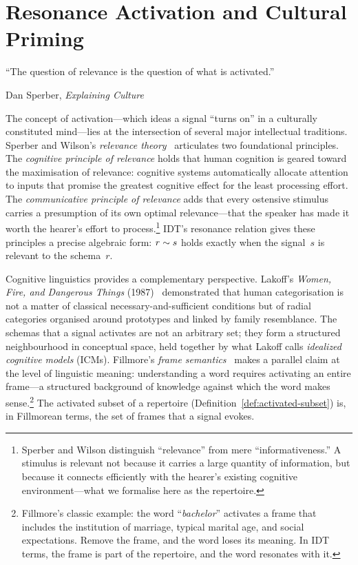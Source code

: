 
\chapter{Resonance Activation and Cultural Priming}
\label{ch:activation}

\epigraph{``The question of relevance is the question of what is
activated.''}{Dan Sperber, \textit{Explaining Culture}}


The concept of activation---which ideas a signal ``turns on'' in a
culturally constituted mind---lies at the intersection of several
major intellectual traditions.  Sperber and Wilson's \emph{relevance
theory}~\cite{sperber1995} articulates two foundational principles.
The \emph{cognitive principle of relevance} holds that human cognition
is geared toward the maximisation of relevance: cognitive systems
automatically allocate attention to inputs that promise the greatest
cognitive effect for the least processing effort.  The
\emph{communicative principle of relevance} adds that every ostensive
stimulus carries a presumption of its own optimal relevance---that the
speaker has made it worth the hearer's effort to
process.\footnote{Sperber and Wilson distinguish ``relevance'' from
mere ``informativeness.''  A stimulus is relevant not because it
carries a large quantity of information, but because it connects
efficiently with the hearer's existing cognitive environment---what we
formalise here as the repertoire.}  IDT's resonance relation gives
these principles a precise algebraic form: $r \sim s$ holds exactly
when the signal~$s$ is relevant to the schema~$r$.

Cognitive linguistics provides a complementary perspective.  Lakoff's
\emph{Women, Fire, and Dangerous Things} (1987)~\cite{lakoff1987}
demonstrated that human categorisation is not a matter of classical
necessary-and-sufficient conditions but of radial categories organised
around prototypes and linked by family resemblance.  The schemas that
a signal activates are not an arbitrary set; they form a structured
neighbourhood in conceptual space, held together by what Lakoff calls
\emph{idealized cognitive models} (ICMs).  Fillmore's \emph{frame
semantics}~\cite{fillmore1982} makes a parallel claim at the level of
linguistic meaning: understanding a word requires activating an entire
frame---a structured background of knowledge against which the word
makes sense.\footnote{Fillmore's classic example: the word
``\emph{bachelor}'' activates a frame that includes the institution of
marriage, typical marital age, and social expectations.  Remove the
frame, and the word loses its meaning.  In IDT terms, the frame is
part of the repertoire, and the word resonates with it.}  The
activated subset of a repertoire (Definition~\ref{def:activated-subset})
is, in Fillmorean terms, the set of frames that a signal evokes.


